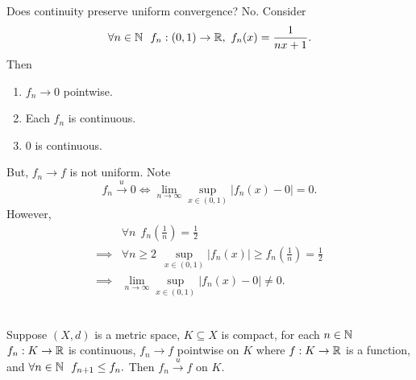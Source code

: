 Does continuity preserve uniform convergence? No. Consider
\begin{align*}
    \forall n \in \mathbb{N} ~~f_n:(0,1) \to \mathbb{R}, ~f_n(x) = \dfrac{1}{nx+1}.
\end{align*}
Then
\begin{enumerate}[$*)$]
    \item $f_n \to 0$ pointwise.
    \item Each $f_n$ is continuous.
    \item $0$ is continuous.
\end{enumerate}
But, $f_n \to f$ is not uniform. Note
\[f_n \overset{u}{\to}0 \iff \lim_{n \to \infty} \underset{x \in (0,1)}{\sup} \left|f_n(x) - 0\right| = 0.\]
However,
\begin{align*}
    &\forall n ~~f_n\left(\frac{1}{n}\right) = \frac{1}{2} \\
    \implies &\forall n \geq 2 ~~\underset{x \in (0,1)}{\sup}\left|f_n(x)\right| \geq f_n\left(\frac{1}{n}\right) = \frac{1}{2} \\
    \implies &\lim_{n \to \infty} \underset{x \in (0,1)}{\sup}\left|f_n(x) - 0\right| \neq 0.
\end{align*}

\begin{theorem} \leavevmode \\
    \label{thm7.13}
    Suppose $(X,d)$ is a metric space, $K\subseteq X$ is compact, for each $n \in \mathbb{N}$ $f_n: K \to \mathbb{R}$ is continuous, $f_n \to f$ pointwise on $K$ where $f:K \to \mathbb{R}$ is a function, and $\forall n \in \mathbb{N} ~~f_{n+1} \leq f_n.$ Then $f_n \overset{u}{\to}f$ on $K$.
\end{theorem}

